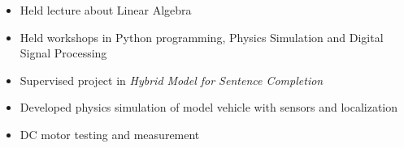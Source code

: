\documentclass[10pt,a4paper]{altacv}
\begin{document}
\tagline{}

%

\begin{fullwidth}
\makecvheader 
\end{fullwidth}

%





\begin{itemize}
    \item   \small{Held lecture about Linear Algebra}
    \item   \small{Held workshops in Python programming, Physics Simulation and Digital Signal Processing}
    \item   \small{Supervised project in \textit{Hybrid Model for Sentence Completion}}
\end{itemize}

\medskip
\divider



\begin{itemize}
    \item   \small{Developed physics simulation of model vehicle with sensors and localization}
    \item   \small{DC motor testing and measurement} \\
    \smallskip
     
\end{itemize}

\end{document}
